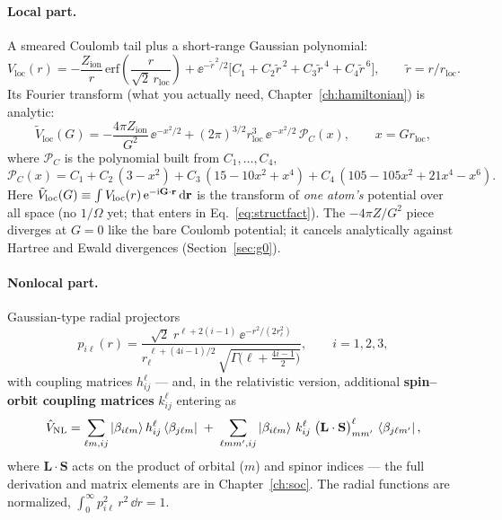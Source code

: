 \paragraph{Local part.} A smeared Coulomb tail plus a short-range Gaussian
polynomial:
\begin{equation}
V_{\mathrm{loc}}(r) = -\frac{Z_{\mathrm{ion}}}{r}\,
\mathrm{erf}\!\left(\frac{r}{\sqrt 2\, r_{\mathrm{loc}}}\right)
+ \ee^{-\tilde r^{\,2}/2}
\Big[C_1 + C_2 \tilde r^{\,2} + C_3 \tilde r^{\,4} + C_4 \tilde r^{\,6}\Big],
\qquad \tilde r = r/r_{\mathrm{loc}} .
\label{eq:hghloc}
\end{equation}
Its Fourier transform (what you actually need, Chapter~\ref{ch:hamiltonian})
is analytic:
\begin{equation}
\tilde V_{\mathrm{loc}}(G) =
-\frac{4\pi Z_{\mathrm{ion}}}{G^2}\, \ee^{-x^2/2}
+ (2\pi)^{3/2} r_{\mathrm{loc}}^3\, \ee^{-x^2/2}\, \mathcal P_C(x),
\qquad x = G r_{\mathrm{loc}},
\label{eq:hghlocG}
\end{equation}
where $\mathcal P_C$ is the polynomial built from $C_1,\dots,C_4$,
\begin{equation}
\mathcal P_C(x) = C_1 + C_2\,(3 - x^2) + C_3\,(15 - 10x^2 + x^4)
+ C_4\,(105 - 105x^2 + 21x^4 - x^6).
\label{eq:hghlocpoly}
\end{equation}
Here $\tilde V_{\mathrm{loc}}(G) \equiv \int V_{\mathrm{loc}}(r)\,
\mathrm{e}^{-\mathrm{i}\mathbf{G}\cdot\mathbf{r}}\,\mathrm{d}\mathbf{r}$ is the transform of \emph{one atom's}
potential over all space (no $1/\Omega$ yet; that enters in
Eq.~\eqref{eq:structfact}).
The $-4\pi Z/G^2$ piece diverges at $G=0$ like the bare Coulomb potential;
it cancels analytically against Hartree and Ewald divergences
(Section~\ref{sec:g0}).

\paragraph{Nonlocal part.} Gaussian-type radial projectors
\begin{equation}
p_{i\ell}(r) = \frac{\sqrt 2\; r^{\ell + 2(i-1)}\,
\ee^{-r^2/(2 r_\ell^2)}}
{r_\ell^{\,\ell + (4i-1)/2}\,
\sqrt{\Gamma\big(\ell + \tfrac{4i-1}{2}\big)}},
\qquad i = 1,2,3,
\label{eq:hghproj}
\end{equation}
with coupling matrices $h^{\ell}_{ij}$ --- and, in the relativistic version,
additional \textbf{spin--orbit coupling matrices} $k^{\ell}_{ij}$ entering as
\begin{equation}
\hat V_{\mathrm{NL}} = \sum_{\ell m, ij} \ket{\beta_{i\ell m}}
h^{\ell}_{ij} \bra{\beta_{j\ell m}}
\;+\; \sum_{\ell m m', ij} \ket{\beta_{i\ell m}}\,
k^{\ell}_{ij}\; \big(\mathbf{L}\cdot\mathbf{S}\big)^{\ell}_{mm'}
\,\bra{\beta_{j\ell m'}} ,
\label{eq:hghso}
\end{equation}
where $\mathbf L \cdot \mathbf S$ acts on the product of orbital ($m$) and
spinor indices --- the full derivation and matrix elements are in
Chapter~\ref{ch:soc}. The radial functions are normalized,
$\int_0^\infty p_{i\ell}^2\, r^2\,\dd r = 1$.

